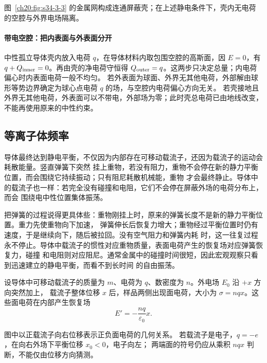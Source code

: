 {图~\ref{ch20:fig:s34-3-3} 的金属网构成连通屏蔽壳；在上述静电条件下，壳内无电荷的空腔与外界电场隔离。

\par\noindent\begin{minipage}{\linewidth}
\faradayCageFigure
{}\label{ch20:fig:s34-3-3}
\end{minipage}\par\medskip


\paragraph{带电空腔：把内表面与外表面分开}
中性孤立导体壳内放入电荷 $q$，在导体材料内取包围空腔的高斯面，因 $E=0$，有
$q+Q_{\rm inner}=0$。再由壳的净电荷守恒得 $Q_{\rm outer}=q$。这两步只决定总量；内电荷偏心时内表面电荷一般不均匀。
若外表面为球面、外界无其他电荷，外部解由球形等势边界确定为球心点电荷 $q$ 的场，与空腔内电荷偏心方向无关。
若壳接地且外界无其他电荷，外表面可以不带电，外部场为零；此时壳总电荷已由地线改变，不能再使用原来的中性约束。


\subsection{等离子体频率}


导体最终达到静电平衡，不仅因为内部存在可移动载流子，还因为载流子的运动会耗散能量。竖直弹簧下突然
挂上重物，若没有阻力，重物不会停在新的静力平衡位置，而会围绕它持续振动；只有阻尼耗散机械能，重物
才会最终静止。导体中的载流子也一样：若完全没有碰撞和电阻，它们不会停在屏蔽外场的电荷分布上，而会
围绕电中性位置集体振荡。

把弹簧的过程说得更具体些：重物刚挂上时，原来的弹簧长度不是新的静力平衡位置。重力先使重物向下加速，
弹簧伸长后恢复力增大；重物经过平衡位置时仍有速度，于是继续向下，随后被拉回。没有空气阻力和弹簧内耗
时，这一往复过程永不停止。导体中载流子的惯性对应重物质量，表面电荷产生的恢复场对应弹簧恢复力，碰撞
和电阻则对应阻尼。通常金属中的碰撞时间很短，因此宏观观察只看到迅速建立的静电平衡，而看不到长时间
的自由振荡。

设导体中可移动载流子的质量为 $m$、电荷为 $q$、数密度为 $n$。外电场 $E_0$ 沿 $+x$ 方向突然加上，
载流子整体位移 $x$ 后，样品两侧出现面电荷，大小为 $\sigma=nqx$。这些面电荷在内部产生恢复场
\[
  E'=-\frac{nq}{\varepsilon_0}x.
\]

图中以正载流子向右位移表示正负面电荷的几何关系。
若载流子是电子，$q=-e$，在向右外场下平衡位移 $x_0<0$，电子向左；
两端面的符号仍应从乘积 $nqx$ 判断，不能仅由位移方向猜测。
\plasmaSlabFigure

}
